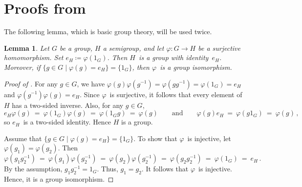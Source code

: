 \documentclass{lmcs}
\newtheorem{lemma}[thm]{Lemma}
\theoremstyle{definition}
\begin{document}



\section{Proofs from \texorpdfstring{}{Section~\ref{sec:upper-two}}}

The following lemma, which is basic group theory, will be used twice.
\begin{lemma} \label{lem:group-ker}
Let $G$ be a group, $H$ a semigroup, and let $\varphi: G \to H$ be a surjective homomorphism.
Set $e_H \coloneqq \varphi(1_G)$.
Then $H$~is a group with identity~$e_H$.
Moreover, if $\{g \in G \mid \varphi(g) = e_H\} = \{1_G\}$, then $\varphi$~is a group isomorphism.
\end{lemma}
\begin{proof}[Proof of ]
For any $g \in G$, we have $\varphi(g) \varphi(g^{-1}) = \varphi(g g^{-1}) = \varphi(1_G) = e_H$ and $\varphi(g^{-1}) \varphi(g) = e_H$.
Since $\varphi$~is surjective, it follows that every element of~$H$ has a two-sided inverse.
Also, for any $g\in G$,
\[
e_H \varphi(g) \ = \ \varphi(1_G) \varphi(g) \ = \ \varphi(1_G g) \ = \ \varphi(g) \qquad \text{and} \qquad
\varphi(g) e_H \ = \ \varphi(g 1_G) \ = \ \varphi(g)\,,
\]
so $e_H$~is a two-sided identity.
Hence $H$ is a group.

Assume that $\{g \in G \mid \varphi(g) = e_H\} = \{1_G\}$.
To show that $\varphi$~is injective, let $\varphi(g_1) = \varphi(g_2)$.
Then
\[
 \varphi(g_1 g_2^{-1}) \ = \ \varphi(g_1) \varphi(g_2^{-1}) \ = \ \varphi(g_2) \varphi(g_2^{-1}) \ = \ \varphi(g_2 g_2^{-1}) \ = \ \varphi(1_G) \ = \ e_H\,.
\]
By the assumption, $g_1 g_2^{-1} = 1_G$.
Thus, $g_1 = g_2$.
It follows that $\varphi$~is injective.
Hence, it is a group isomorphism.
\end{proof}
\end{document}
